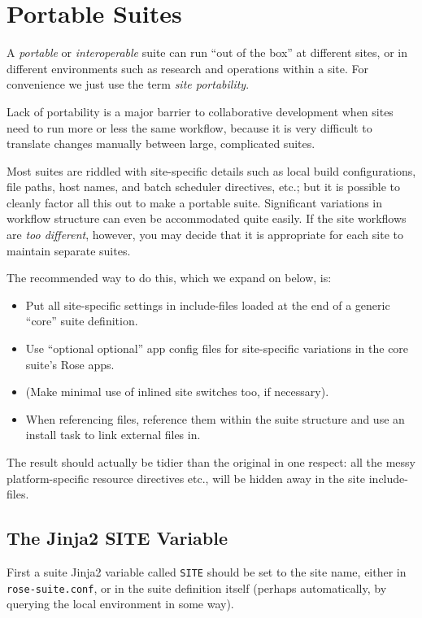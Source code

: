 \section{Portable Suites}
\label{Portable Suites}

A {\em portable} or {\em interoperable} suite can run ``out of the box'' at
different sites, or in different environments such as research and operations
within a site.  For convenience we just use the term {\em site portability}.

Lack of portability is a major barrier to collaborative development when
sites need to run more or less the same workflow, because it is very
difficult to translate changes manually between large, complicated suites.

Most suites are riddled with site-specific details such as local build
configurations, file paths, host names, and batch scheduler directives, etc.;
but it is possible to cleanly factor all this out to make a portable suite.
Significant variations in workflow structure can even be accommodated quite
easily. If the site workflows are {\em too different}, however, you may decide
that it is appropriate for each site to maintain separate suites.

The recommended way to do this, which we expand on below, is:

\begin{itemize}
  \item Put all site-specific settings in include-files loaded at the end
    of a generic ``core'' suite definition.
  \item Use ``optional optional'' app config files for site-specific variations
    in the core suite's Rose apps.
  \item (Make minimal use of inlined site switches too, if necessary).
  \item When referencing files, reference them within the suite structure and
  use an install task to link external files in.
\end{itemize}

The result should actually be tidier than the original in one respect: all
the messy platform-specific resource directives etc., will be hidden away in
the site include-files.

\subsection{The Jinja2 SITE Variable}

First a suite Jinja2 variable called \lstinline=SITE= should be set to the site
name, either in \lstinline=rose-suite.conf=, or in the suite definition itself
(perhaps automatically, by querying the local environment in some way).

